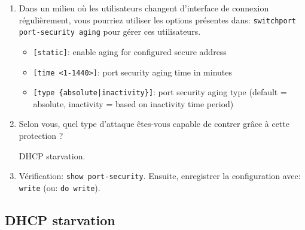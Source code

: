 \documentclass[a4paper]{article}
\begin{document}
\begin{enumerate}
\item Dans un milieu où les utilisateurs changent d’interface de connexion régulièrement, vous pourriez utiliser les options présentes dans: \texttt{switchport port-security aging} pour gérer ces utilisateurs.
\begin{example}
    \begin{itemize}
        \item \texttt{[static]}: enable aging for configured secure address
        \item \texttt{[time <1-1440>]}: port security aging time in minutes
        \item \texttt{[type \{absolute|inactivity\}]}: port security aging type (default = absolute, inactivity = based on inactivity time period)
    \end{itemize}
\end{example}

\item Selon vous, quel type d’attaque êtes-vous capable de contrer grâce à cette protection ?
\begin{example}
    DHCP starvation.
\end{example}

\item Vérification: \texttt{show port-security}. Ensuite, enregistrer la configuration avec: \texttt{write} (ou: \texttt{do write}).

\end{enumerate}










\subsection{DHCP starvation}
\end{document}
